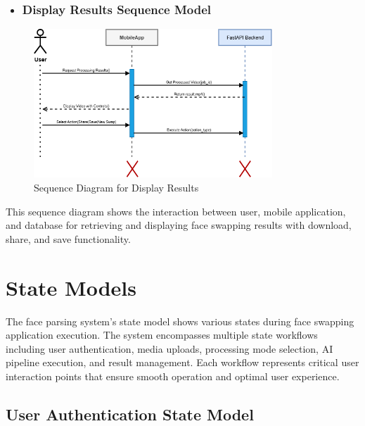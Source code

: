 \documentclass[12pt,a4paper]{report}
\begin{document}
\begin{itemize}
    \item \subsubsection{Display Results Sequence Model}
\end{itemize}

\begin{figure}[H]
\centering
\includegraphics[width=0.8\textwidth]{figures/display_results_sequence.png}
\caption{Sequence Diagram for Display Results}
\label{fig:display_sequence}
\end{figure}

This sequence diagram shows the interaction between user, mobile application, and database for retrieving and displaying face swapping results with download, share, and save functionality.
\section{State Models}

The face parsing system's state model shows various states during face swapping application execution. The system encompasses multiple state workflows including user authentication, media uploads, processing mode selection, AI pipeline execution, and result management. Each workflow represents critical user interaction points that ensure smooth operation and optimal user experience.

\subsection{User Authentication State Model}
\end{document}
